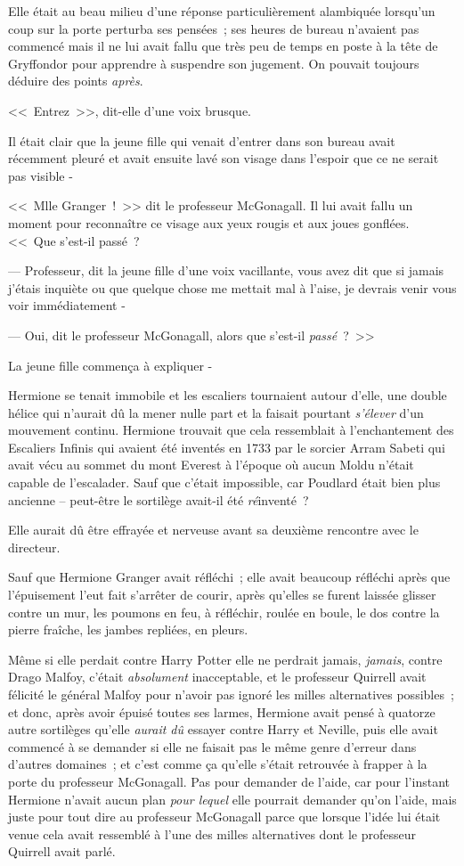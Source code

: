Elle était au beau milieu d'une réponse particulièrement alambiquée lorsqu'un coup sur la porte perturba ses pensées~; ses heures de bureau n'avaient pas commencé mais il ne lui avait fallu que très peu de temps en poste à la tête de Gryffondor pour apprendre à suspendre son jugement. On pouvait toujours déduire des points \emph{après}.

<<~Entrez~>>, dit-elle d'une voix brusque.

Il était clair que la jeune fille qui venait d'entrer dans son bureau avait récemment pleuré et avait ensuite lavé son visage dans l'espoir que ce ne serait pas visible -

<<~Mlle Granger~!~>> dit le professeur McGonagall. Il lui avait fallu un moment pour reconnaître ce visage aux yeux rougis et aux joues gonflées. <<~Que s'est-il passé~?

--- Professeur, dit la jeune fille d'une voix vacillante, vous avez dit que si jamais j'étais inquiète ou que quelque chose me mettait mal à l'aise, je devrais venir vous voir immédiatement -

--- Oui, dit le professeur McGonagall, alors que s'est-il \emph{passé}~?~>>

La jeune fille commença à expliquer -

\later

Hermione se tenait immobile et les escaliers tournaient autour d'elle, une double hélice qui n'aurait dû la mener nulle part et la faisait pourtant \emph{s'élever} d'un mouvement continu. Hermione trouvait que cela ressemblait à l'enchantement des Escaliers Infinis qui avaient été inventés en 1733 par le sorcier Arram Sabeti qui avait vécu au sommet du mont Everest à l'époque où aucun Moldu n'était capable de l'escalader. Sauf que c'était impossible, car Poudlard était bien plus ancienne -- peut-être le sortilège avait-il été \emph{ré}inventé~?

Elle aurait dû être effrayée et nerveuse avant sa deuxième rencontre avec le directeur.

Sauf que Hermione Granger avait réfléchi~; elle avait beaucoup réfléchi après que l'épuisement l'eut fait s'arrêter de courir, après qu'elles se furent laissée glisser contre un mur, les poumons en feu, à réfléchir, roulée en boule, le dos contre la pierre fraîche, les jambes repliées, en pleurs.

Même si elle perdait contre Harry Potter elle ne perdrait jamais, \emph{jamais}, contre Drago Malfoy, c'était \emph{absolument} inacceptable, et le professeur Quirrell avait félicité le général Malfoy pour n'avoir pas ignoré les milles alternatives possibles~; et donc, après avoir épuisé toutes ses larmes, Hermione avait pensé à quatorze autre sortilèges qu'elle \emph{aurait dû} essayer contre Harry et Neville, puis elle avait commencé à se demander si elle ne faisait pas le même genre d'erreur dans d'autres domaines~; et c'est comme ça qu'elle s'était retrouvée à frapper à la porte du professeur McGonagall. Pas pour demander de l'aide, car pour l'instant Hermione n'avait aucun plan \emph{pour lequel} elle pourrait demander qu'on l'aide, mais juste pour tout dire au professeur McGonagall parce que lorsque l'idée lui était venue cela avait ressemblé à l'une des milles alternatives dont le professeur Quirrell avait parlé.

